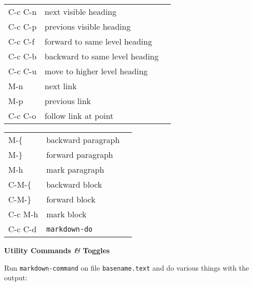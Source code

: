 \documentclass[10pt]{article}
\newcommand{\keyfont}{\keyfontfamily}
\newcommand{\decorfont}{\decorfontfamily}
\newcommand{\sectionfont}{\normalsize\headingfontfamily\bfseries}
\newcommand{\flourishfont}{\large\flourishfontfamily}
\newcommand{\key}[1]{{\keyfont #1}}
\newcommand{\desc}[1]{#1}
\renewcommand{\section}[1]{%
  \medskip%
  \centerline{%
    \ruleflourish{}%
    \hspace{1ex}%
    {\sectionfont #1}%
    \hspace{1ex}%
    \ruleflourish{}%
  }%
  \medskip}
\newcommand{\amper}{\textit{\&}}
\newcommand{\ruleflourish}{\flourishfont\XeTeXglyph405}
\begin{document}
\begin{minipage}[t]{0.5\textwidth}
\begin{tabular}[t]{lll}
\key{C-c C-n}  & \desc{next visible heading}           \\
\key{C-c C-p}  & \desc{previous visible heading}       \\
\key{C-c C-f}  & \desc{forward to same level heading}  \\
\key{C-c C-b}  & \desc{backward to same level heading} \\
\key{C-c C-u}  & \desc{move to higher level heading}   \\
\key{M-n}      & \desc{next link}                      \\
\key{M-p}      & \desc{previous link}                  \\
\key{C-c C-o}  & \desc{follow link at point}           \\
\end{tabular}
\end{minipage}
%
\begin{minipage}[t]{0.5\textwidth}
\begin{tabular}[t]{lll}
\key{M-\{}     & \desc{backward paragraph}             \\
\key{M-\}}     & \desc{forward paragraph}              \\
\key{M-h}      & \desc{mark paragraph}                 \\
\key{C-M-\{}   & \desc{backward block}                 \\
\key{C-M-\}}   & \desc{forward block}                  \\
\key{C-c M-h}  & \desc{mark block}                     \\
\key{C-c C-d}  & \desc{\texttt{markdown-do}}           \\
\end{tabular}
\end{minipage}


\section{Utility Commands \amper{} Toggles}

Run \texttt{markdown-command} on file \texttt{basename.text}
and do various things with the output:
\end{document}
